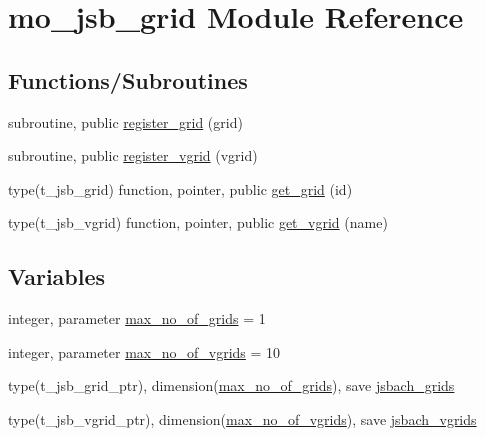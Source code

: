 \hypertarget{namespacemo__jsb__grid}{}\section{mo\+\_\+jsb\+\_\+grid Module Reference}
\label{namespacemo__jsb__grid}
\subsection*{Functions/\+Subroutines}
\begin{DoxyCompactItemize}
\item 
subroutine, public \hyperlink{namespacemo__jsb__grid_a7dc7b6b26aa0f0cce8b32e1f7f3307d6}{register\+\_\+grid} (grid)
\item 
subroutine, public \hyperlink{namespacemo__jsb__grid_a043909fe2d80d058e59831341f25fdab}{register\+\_\+vgrid} (vgrid)
\item 
type(t\+\_\+jsb\+\_\+grid) function, pointer, public \hyperlink{namespacemo__jsb__grid_ad009e7ddbafe2ef26506e2a5abdeb4db}{get\+\_\+grid} (id)
\item 
type(t\+\_\+jsb\+\_\+vgrid) function, pointer, public \hyperlink{namespacemo__jsb__grid_a2111791e291579cc1551a4213a670e35}{get\+\_\+vgrid} (name)
\end{DoxyCompactItemize}
\subsection*{Variables}
\begin{DoxyCompactItemize}
\item 
integer, parameter \hyperlink{namespacemo__jsb__grid_a1d86a8db41131c146df75f25afca96ed}{max\+\_\+no\+\_\+of\+\_\+grids} = 1
\item 
integer, parameter \hyperlink{namespacemo__jsb__grid_a9155254cdfdc8f5d4faab808185807d6}{max\+\_\+no\+\_\+of\+\_\+vgrids} = 10
\item 
type(t\+\_\+jsb\+\_\+grid\+\_\+ptr), dimension(\hyperlink{namespacemo__jsb__grid_a1d86a8db41131c146df75f25afca96ed}{max\+\_\+no\+\_\+of\+\_\+grids}), save \hyperlink{namespacemo__jsb__grid_a575fc745dca08fbc468cfa38e731e25e}{jsbach\+\_\+grids}
\item 
type(t\+\_\+jsb\+\_\+vgrid\+\_\+ptr), dimension(\hyperlink{namespacemo__jsb__grid_a9155254cdfdc8f5d4faab808185807d6}{max\+\_\+no\+\_\+of\+\_\+vgrids}), save \hyperlink{namespacemo__jsb__grid_a861c396d0d03f42c064fa5ff78f7cc58}{jsbach\+\_\+vgrids}
\end{DoxyCompactItemize}


